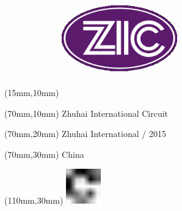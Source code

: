 \null\newpage
\begin{textblock*}{50mm}(15mm,10mm)%
\includegraphics[width=50mm]{LG/ZHU.png}
\end{textblock*}
\begin{textblock*}{130mm}(70mm,10mm)%
{\fontsize{20}{20}\selectfont Zhuhai International Circuit}\\
\end{textblock*}
\begin{textblock*}{120mm}(70mm,20mm)%
{\fontsize{16}{16}\selectfont Zhuhai International / 2015}\\
\end{textblock*}
\begin{textblock*}{120mm}(70mm,30mm)%
{\fontsize{12}{12}\selectfont China}
\end{textblock*}
\begin{textblock*}{30mm}(110mm,30mm)%
\centering
\includegraphics[height=15mm]{icons/fa-rotate-right.pdf}
\end{textblock*}
